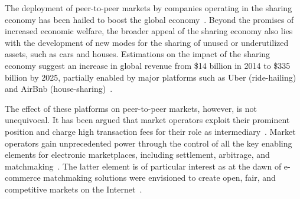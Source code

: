 The deployment of peer-to-peer markets by companies operating in the sharing economy has been hailed to boost the global economy~\cite{malhotra2014dark}.
Beyond the promises of increased economic welfare, the broader appeal of the sharing economy also lies with the development of new modes for the sharing of unused or underutilized assets, such as cars and houses. %
Estimations on the impact of the sharing economy suggest an increase in global revenue from \$14 billion in 2014 to \$335 billion by 2025, partially enabled by major platforms such as Uber (ride-hailing) and AirBnb (house-sharing)~\cite{pwcsharingeconomy}. %

The effect of these platforms on peer-to-peer markets, however, is not unequivocal.
It has been argued that market operators exploit their prominent position and charge high transaction fees for their role as intermediary~\cite{schor2016debating}. %
Market operators gain unprecedented power through the control of all the key enabling elements for electronic marketplaces, including settlement, arbitrage, and matchmaking~\cite{oecd2019,pepper2019,azevedo2016}.
The latter element is of particular interest as at the dawn of e-commerce matchmaking solutions were envisioned to create open, fair, and competitive markets on the Internet~\cite{trastour2002}.

